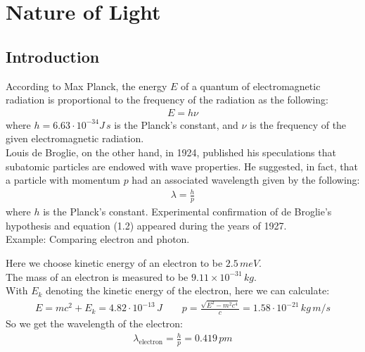 \documentclass[11pt]{book}
\theoremstyle{break}
\theoremstyle{break}
\newcommand{\example}{\color{green}Example: \color{black}}
\begin{document}
\newpage 
\tableofcontents
{}

\newpage
\setcounter{page}{1}
\vspace*{\fill}

\newpage
\chapter{Nature of Light}
\section[Introduction]{\color{red}Introduction\color{black}}

According to Max Planck, the energy $E$ of a quantum of electromagnetic radiation is proportional to the frequency of the radiation as the following:
\begin{align}
E = h\nu
\end{align}
where $h=6.63\cdot 10^{-34}J\, s$ is the Planck's constant, and $\nu$ is the frequency of the given electromagnetic radiation.\\

Louis de Broglie, on the other hand, in 1924, published his speculations that subatomic particles are endowed with wave properties. He suggested, in fact, that a particle with momentum $p$ had an associated wavelength given by the following:
\begin{align}
\lambda = \frac{h}{p} 
\end{align}
where $h$ is the Planck's constant. Experimental confirmation of de Broglie's hypothesis and equation (1.2) appeared during the years of 1927.\\

\example Comparing electron and photon.

Here we choose kinetic energy of an electron to be $2.5 \, meV$.\\
The mass of an electron is measured to be $9.11\times 10^{-31}\, kg$.\\

With $E_k$ denoting the kinetic energy of the electron, here we can calculate:
\begin{align*}
E = mc^2 + E_k = 4.82\cdot 10^{-13}\, J 
\qquad p = \frac{\sqrt{E^2 - m^2c^4}}{c} = 1.58\cdot 10^{-21}\,kg\,m/s
\end{align*}
So we get the wavelength of the electron:
\begin{align*}
\lambda_{\text{electron}} = \frac{h}{p} = 0.419 \, pm
\end{align*}
\end{document}
